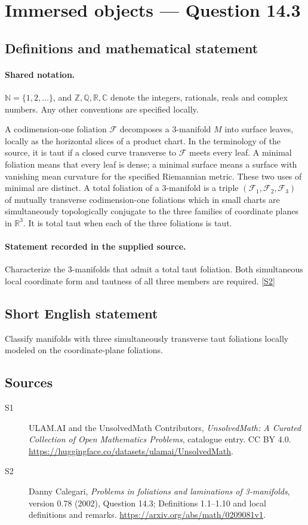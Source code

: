 \documentclass[11pt]{article}
\newcommand{\sref}[2]{\hyperlink{source:#1:#2}{[S#2]}}
\begin{document}
\section{Immersed objects — Question 14.3}\label{statement}

\subsection{Definitions and mathematical statement}

\paragraph{Shared notation.}$\mathbb N=\{1,2,\ldots\}$, and $\mathbb Z,\mathbb Q,\mathbb R,\mathbb C$ denote the integers, rationals, reals and complex numbers. Any other conventions are specified locally.


A codimension-one foliation $\mathcal F$ decomposes a $3$-manifold $M$ into surface leaves, locally as the horizontal slices of a product chart. In the terminology of the source, it is taut if a closed curve transverse to $\mathcal F$ meets every leaf. A minimal foliation means that every leaf is dense; a minimal surface means a surface with vanishing mean curvature for the specified Riemannian metric. These two uses of minimal are distinct. A total foliation of a $3$-manifold is a triple $(\mathcal F_1,\mathcal F_2,\mathcal F_3)$ of mutually transverse codimension-one foliations which in small charts are simultaneously topologically conjugate to the three families of coordinate planes in $\mathbb R^3$. It is total taut when each of the three foliations is taut.
\paragraph{Statement recorded in the supplied source.}
Characterize the $3$-manifolds that admit a total taut foliation. Both simultaneous local coordinate form and tautness of all three members are required. \sref{statement}{2}
\subsection{Short English statement}
Classify manifolds with three simultaneously transverse taut foliations locally modeled on the coordinate-plane foliations.
\subsection{Sources}
\begin{description}
\item[\hypertarget{source:statement:1}{S1}] ULAM.AI and the UnsolvedMath Contributors, \emph{UnsolvedMath: A Curated Collection of Open Mathematics Problems}, catalogue entry. CC BY 4.0. \url{https://huggingface.co/datasets/ulamai/UnsolvedMath}.
\item[\hypertarget{source:statement:2}{S2}] Danny Calegari, \emph{Problems in foliations and laminations of 3-manifolds}, version 0.78 (2002), Question 14.3; Definitions 1.1--1.10 and local definitions and remarks. \url{https://arxiv.org/abs/math/0209081v1}.
\end{description}
\label{end:statement}
\end{document}

